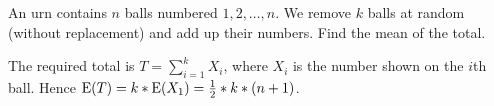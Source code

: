 \question An urn contains $n$ balls numbered $1, 2, \dotsc , n$. We 
remove $k$ balls at random (without replacement) and add up their 
numbers. Find the mean of the total. 
\begin{solution}[1cm]
The required total is $T=\sum_{i = 1}^{k} X_i$, where $X_i$ is the 
number shown on the $i$th ball. Hence $\text{E}(T) = k * \text{E}(X_1) = 
\frac{1}{2} * k * (n + 1)$. 

\begin{comment}
Now calculate:
\begin{equation}
\begin{split}
\E((\sum_{i = 1}^{k} X_i)^2) &= k \E(X_1^2) + k*(k - 1)*\E(X_1*X_2) \\ \nonumber
&= \frac{k}{n} \sum_{1}^{n} j^2 + \frac{k * (k - 1)}{n * (n - 1)} * 
2 * \sum_{i>j} i * j \\
&= \frac{k}{n} (\frac{1}{3} * n * (n + 1) * (n + 2) - \frac{1}{2} * 
n * (n + 1)) \\
&+ \frac{k * (k - 1)}{n * (n - 1)} * \sum_{j = 1}^{n} j * (n * (n + 1) 
- j * (j + 1)) \\
&= \frac{1}{6} * k * (n + 1) * (2n + 1) + \frac{1}{12} * k * (k - 1) * 
(3n + 2) * (n + 1)
\end{split}
\end{equation}
Hence,
\[\var(T) = k (n + 1)  (\frac{1}{6}  k  (n + 1) (2n + 1) + \frac{1}{12} 
 k  (k - 1)  (3n + 2)  (n + 1) - \frac{1}{4}  k  (n + 1)) \]
\[= \frac{1}{12}  (n + 1)  k  (n - k)\]
\end{comment}
\end{solution}